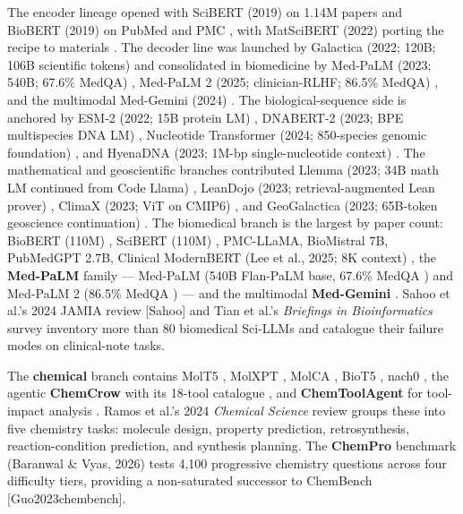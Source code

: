 \documentclass{article}
\begin{document}
The encoder lineage opened with SciBERT (2019) on 1.14M papers \cite{beltagy2019arxiv1903106762019} and BioBERT (2019) on PubMed and PMC \cite{lee2019bioinformatics2019}, with MatSciBERT (2022) porting the recipe to materials \cite{gupta2022matscibertamateria}. The decoder line was launched by Galactica (2022; 120B; 106B scientific tokens) \cite{taylor2022arxiv2211090852022} and consolidated in biomedicine by Med-PaLM (2023; 540B; 67.6\% MedQA) \cite{singhal2023largelanguagemodel}, Med-PaLM 2 (2025; clinician-RLHF; 86.5\% MedQA) \cite{singhal2025towardexpertlevelm}, and the multimodal Med-Gemini (2024) \cite{yang2024advancingmultimoda}. The biological-sequence side is anchored by ESM-2 (2022; 15B protein LM) \cite{lin2022evolutionaryscalep}, DNABERT-2 (2023; BPE multispecies DNA LM) \cite{zhou2023arxiv2306150062023}, Nucleotide Transformer (2024; 850-species genomic foundation) \cite{dallatorre2024nucleotidetransfor}, and HyenaDNA (2023; 1M-bp single-nucleotide context) \cite{nguyen2023hyenadnalongrangeg}. The mathematical and geoscientific branches contributed Llemma (2023; 34B math LM continued from Code Llama) \cite{azerbayev2023llemmaanopenlangua}, LeanDojo (2023; retrieval-augmented Lean prover) \cite{yang2023leandojotheorempro}, ClimaX (2023; ViT on CMIP6) \cite{nguyen2023arxiv2301103432023}, and GeoGalactica (2023; 65B-token geoscience continuation) \cite{lin2023geogalacticaascien}. The biomedical branch is the largest by paper count: BioBERT (110M) \cite{lee2019bioinformatics2019}, SciBERT (110M) \cite{beltagy2019arxiv1903106762019}, PMC-LLaMA, BioMistral 7B, PubMedGPT 2.7B, Clinical ModernBERT (Lee et al., 2025; 8K context) \cite{lee2025arxiv2504039642025}, the \textbf{Med-PaLM} family --- Med-PaLM (540B Flan-PaLM base, 67.6\% MedQA \cite{singhal2023largelanguagemodel}) and Med-PaLM 2 (86.5\% MedQA \cite{singhal2025towardexpertlevelm}) --- and the multimodal \textbf{Med-Gemini} \cite{yang2024advancingmultimoda}. Sahoo et al.'s 2024 JAMIA review {[}Sahoo{]} and Tian et al.'s \emph{Briefings in Bioinformatics} survey \cite{tian2023opportunitiesandch} inventory more than 80 biomedical Sci-LLMs and catalogue their failure modes on clinical-note tasks.

The \textbf{chemical} branch contains MolT5 \cite{edwards2022emnlp2022}, MolXPT \cite{liu2023acl2023}, MolCA \cite{liu2023emnlp2023}, BioT5 \cite{pei2023emnlp2023}, nach0 \cite{livne2024nach0multimodalnat}, the agentic \textbf{ChemCrow} with its 18-tool catalogue \cite{bran2024naturemachineintel}, and \textbf{ChemToolAgent} for tool-impact analysis \cite{yu2024chemtoolagenttheim}. Ramos et al.'s 2024 \emph{Chemical Science} review \cite{ramos2024chemicalscience202} groups these into five chemistry tasks: molecule design, property prediction, retrosynthesis, reaction-condition prediction, and synthesis planning. The \textbf{ChemPro} benchmark (Baranwal \& Vyas, 2026) \cite{baranwal2026arxiv2602031082026} tests 4,100 progressive chemistry questions across four difficulty tiers, providing a non-saturated successor to ChemBench {[}Guo2023chembench{]}.
\end{document}
